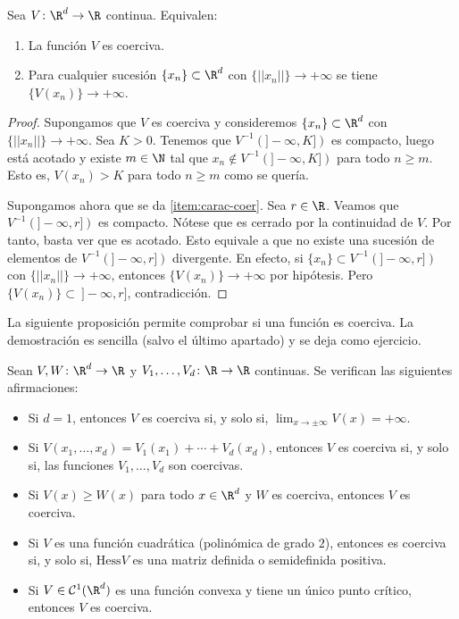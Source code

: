 \documentclass{article}
\begin{document}
\begin{proposition}
  Sea $V \colon \R^d \to \R$ continua. Equivalen:
  \begin{enumerate}
  \item La función $V$ es coerciva.
  \item\label{item:carac-coer} Para cualquier sucesión $\{x_n\} \subset \R^d$ con
    $\{||x_n||\} \to + \infty$ se tiene $\{V(x_n)\} \to +\infty$.
  \end{enumerate}
\end{proposition}
\begin{proof}
  Supongamos que $V$ es coerciva y consideremos $\{x_n\} \subset \R^d$ con
  $\{||x_n||\} \to + \infty$. Sea $K > 0$. Tenemos que $V^{-1}(]-\infty, K])$ es compacto, luego
  está acotado y existe $m \in \N$ tal que $x_n \not \in V^{-1}(]-\infty, K])$ para todo $n \ge m$.
  Esto es, $V(x_n) > K$ para todo $n \ge m$ como se quería.

  Supongamos ahora que se da \ref{item:carac-coer}. Sea $r \in \R$. Veamos que
  $V^{-1}(]-\infty, r])$ es compacto. Nótese que es cerrado por la continuidad de $V$. Por tanto,
  basta ver que es acotado. Esto equivale a que no existe una sucesión de elementos de
  $V^{-1}(]-\infty, r])$ divergente. En efecto, si $\{x_n\} \subset V^{-1}(]-\infty, r])$ con
  $\{||x_n||\} \to + \infty$, entonces $\{V(x_n)\} \to +\infty$ por hipótesis. Pero
  $\{V(x_n)\} \subset\ ]-\infty, r]$, contradicción.
\end{proof}

La siguiente proposición permite comprobar si una función es coerciva. La demostración es sencilla
(salvo el último apartado) y se deja como ejercicio.

\begin{prop}
  Sean $V, W \colon \R^d \to \R$ y $V_1, \ldots, V_d \colon \R \to \R$ continuas. Se verifican las
  siguientes afirmaciones:
  \begin{itemize}
  \item Si $d = 1$, entonces $V$ es coerciva si, y solo si, $\lim_{x \to \pm \infty}V(x) = +\infty$.
  \item Si $V(x_1, \ldots, x_d) = V_1(x_1)+ \cdots + V_d(x_d)$, entonces $V$ es coerciva si, y solo
    si, las funciones $V_1, \ldots, V_d$ son coercivas.
  \item Si $V(x) \ge W(x)$ para todo $x \in \R^d$ y $W$ es coerciva, entonces $V$ es coerciva.
  \item Si $V$ es una función cuadrática (polinómica de grado $2$), entonces es coerciva si, y solo
    si, $\mathrm{Hess} V$ es una matriz definida o semidefinida positiva.
  \item Si $V \in \mathcal{C}^1(\R^d)$ es una función convexa y tiene un único punto crítico,
    entonces $V$ es coerciva.
  \end{itemize}
\end{prop}
\end{document}
